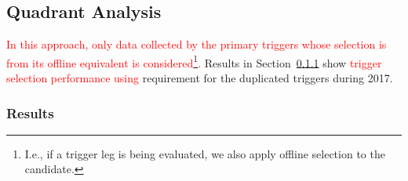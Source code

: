 \subsection{Quadrant Analysis}\label{ssec:quadrant}

\textcolor{red}{In this approach, only data collected by the primary triggers whose selection is from its offline equivalent is considered\footnote{I.e., if a \tight{} trigger leg is being evaluated, we also apply \tight{} offline selection to the candidate.}.}
Results in Section~\ref{top:quadrant_results} show
\textcolor{red}{trigger selection performance using} \tight{} requirement for the duplicated triggers during
2017.

\subsubsection{Results}\label{top:quadrant_results}


